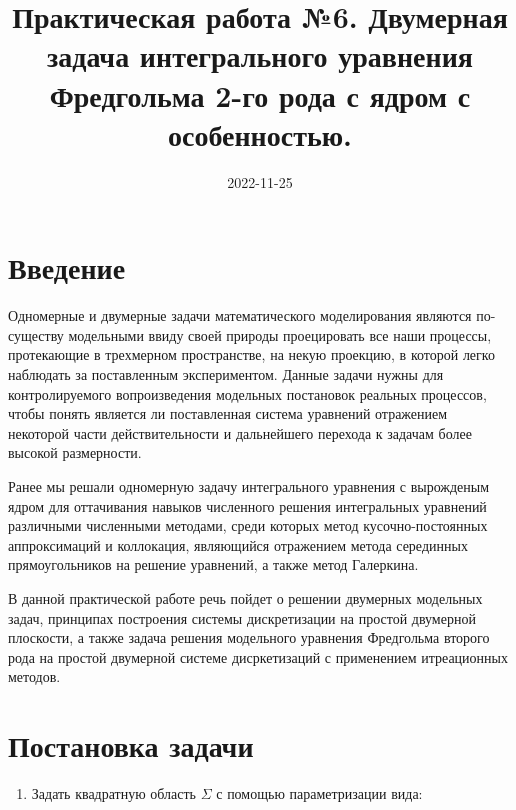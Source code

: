 \documentclass[
]{article}
\title{Практическая работа №6. Двумерная задача интегрального уравнения
Фредгольма 2-го рода с ядром с особенностью.}
\author{}
\date{\vspace{-2.5em}2022-11-25}
\providecommand{\tightlist}{%
  \setlength{\itemsep}{0pt}\setlength{\parskip}{0pt}}
\begin{document}
\maketitle

\hypertarget{ux432ux432ux435ux434ux435ux43dux438ux435}{%
\section{\texorpdfstring{\textbf{Введение}}{Введение}}\label{ux432ux432ux435ux434ux435ux43dux438ux435}}

Одномерные и двумерные задачи математического моделирования являются
по-существу модельными ввиду своей природы проецировать все наши
процессы, протекающие в трехмерном пространстве, на некую проекцию, в
которой легко наблюдать за поставленным экспериментом. Данные задачи
нужны для контролируемого вопроизведения модельных постановок реальных
процессов, чтобы понять является ли поставленная система уравнений
отражением некоторой части действительности и дальнейшего перехода к
задачам более высокой размерности.

Ранее мы решали одномерную задачу интегрального уравнения с вырожденым
ядром для оттачивания навыков численного решения интегральных уравнений
различными численными методами, среди которых метод кусочно-постоянных
аппроксимаций и коллокация, являющийся отражением метода серединных
прямоугольников на решение уравнений, а также метод Галеркина.

В данной практической работе речь пойдет о решении двумерных модельных
задач, принципах построения системы дискретизации на простой двумерной
плоскости, а также задача решения модельного уравнения Фредгольма
второго рода на простой двумерной системе дисркетизаций с применением
итреационных методов.

\hypertarget{ux43fux43eux441ux442ux430ux43dux43eux432ux43aux430-ux437ux430ux434ux430ux447ux438}{%
\section{\texorpdfstring{\textbf{Постановка
задачи}}{Постановка задачи}}\label{ux43fux43eux441ux442ux430ux43dux43eux432ux43aux430-ux437ux430ux434ux430ux447ux438}}

\begin{enumerate}
\def\labelenumi{\arabic{enumi}.}
\tightlist
\item
  Задать квадратную область \(\Sigma\) с помощью параметризации вида:
\end{enumerate}
\end{document}
